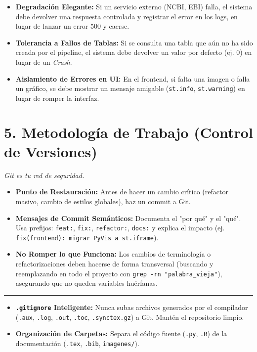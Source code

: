 \documentclass[11pt, a4paper]{article}
\begin{document}
	\begin{itemize}
		\item \textbf{Degradación Elegante:} Si un servicio externo (NCBI, EBI) falla, el sistema debe devolver una respuesta controlada y registrar el error en los logs, en lugar de lanzar un error 500 y caerse.
		\item \textbf{Tolerancia a Fallos de Tablas:} Si se consulta una tabla que aún no ha sido creada por el pipeline, el sistema debe devolver un valor por defecto (ej. 0) en lugar de un \textit{Crash}.
		\item \textbf{Aislamiento de Errores en UI:} En el frontend, si falta una imagen o falla un gráfico, se debe mostrar un mensaje amigable (\texttt{st.info}, \texttt{st.warning}) en lugar de romper la interfaz.
	\end{itemize}
	
	\section*{\color{primary} 5. Metodología de Trabajo (Control de Versiones)}
	\textit{\color{secondary} Git es tu red de seguridad.}
	
	\begin{itemize}
		\item \textbf{Punto de Restauración:} Antes de hacer un cambio crítico (refactor masivo, cambio de estilos globales), haz un commit a Git.
		\item \textbf{Mensajes de Commit Semánticos:} Documenta el "por qué" y el "qué". Usa prefijos: \texttt{feat:}, \texttt{fix:}, \texttt{refactor:}, \texttt{docs:} y explica el impacto (ej. \texttt{fix(frontend): migrar PyVis a st.iframe}).
		\item \textbf{No Romper lo que Funciona:} Los cambios de terminología o refactorizaciones deben hacerse de forma transversal (buscando y reemplazando en todo el proyecto con \texttt{grep -rn "palabra\_vieja"}), asegurando que no queden variables huérfanas.
	\end{itemize}
	
	\vspace{2mm}
	\hrule
	\vspace{2mm}
	
	\begin{tcolorbox}[colback=codebg, colframe=accent, arc=2mm, title={\textbf{\emoji{bulb} Bonus Track: Higiene en LaTeX (se tratara de montar con LaTeX)}}]
		\begin{itemize}
			\item \textbf{\texttt{.gitignore} Inteligente:} Nunca subas archivos generados por el compilador (\texttt{.aux}, \texttt{.log}, \texttt{.out}, \texttt{.toc}, \texttt{.synctex.gz}) a Git. Mantén el repositorio limpio.
			\item \textbf{Organización de Carpetas:} Separa el código fuente (\texttt{.py}, \texttt{.R}) de la documentación (\texttt{.tex}, \texttt{.bib}, \texttt{imagenes/}).
		\end{itemize}
	\end{tcolorbox}
	
\end{document}
